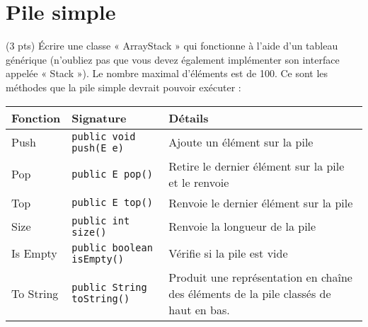\documentclass[9pt]{report}
\begin{document}
    \chapter{Pile simple}
    \begin{Exercice}{(3 pts)}{}
      Écrire une classe « ArrayStack » qui fonctionne à l'aide d'un tableau 
      générique (n’oubliez pas que vous
      devez également implémenter son interface appelée « Stack »). 
      Le nombre maximal d’éléments est de
      100. Ce sont les méthodes que la pile simple devrait 
      pouvoir exécuter :
    \end{Exercice}


  \begin{table}[H]

    \begin{center}
      \renewcommand{\arraystretch}{1.5}
      \selectfont
      \footnotesize
          \begin{tabular}{p{2cm} p{4cm} p{4cm}}
          \arrayrulecolor{blue}\hline
          \rowcolor{draculawhite-background}
          \textcolor{myb}{Fonction} & 
          \textcolor{myb}{Signature} & 
          \textcolor{myb}{Détails}  
          \\
          \hline
          \arrayrulecolor{black}
          Push   & 
          \texttt{public void push(E e)}  
                 &
          Ajoute un élément sur la pile 
          \\
          \hline
          Pop   &  
          \texttt{public E pop()}  
                &
          Retire le dernier élément sur la pile et le renvoie
          \\
          \hline
          Top  &
          \texttt{public E top()} 
               &
          Renvoie le dernier élément sur la pile
          \\ 
          \hline
          Size & 
          \texttt{public int size()}  
               &
          Renvoie la longueur de la pile
          \\
          \hline 
          Is Empty & 
          \texttt{public boolean isEmpty()}  
                   &
          Vérifie si la pile est vide
          \\
          \hline 
          To String & 
          \texttt{public String toString()}  
                    &
          Produit une représentation en chaîne des éléments 
          de la pile classés de haut en bas. 
          \\ 
          \hline
          \end{tabular}
  \end{center}
  \end{table}
  \vspace{-1em}
\end{document}
